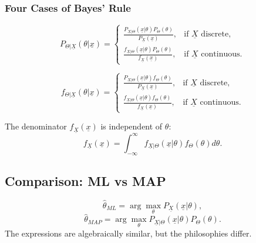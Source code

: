 \subsubsection{Four Cases of Bayes' Rule}
\begin{definition}
    \[
    P_{\Theta|\underline{X}}(\theta|\underline{x}) =
    \begin{cases}
        \frac{P_{\underline{X}|\Theta}(\underline{x}|\theta)P_\Theta(\theta)}{P_{\underline{X}}(\underline{x})}, & \text{if } \underline{X} \text{ discrete}, \\
        \frac{f_{\underline{X}|\Theta}(\underline{x}|\theta)P_\Theta(\theta)}{f_{\underline{X}}(\underline{x})}, & \text{if } \underline{X} \text{ continuous}.
    \end{cases}
    \]

    \[
    f_{\Theta|\underline{X}}(\theta|\underline{x}) =
    \begin{cases}
        \frac{P_{\underline{X}|\Theta}(\underline{x}|\theta)f_\Theta(\theta)}{P_{\underline{X}}(\underline{x})}, & \text{if } \underline{X} \text{ discrete}, \\
        \frac{f_{\underline{X}|\Theta}(\underline{x}|\theta)f_\Theta(\theta)}{f_{\underline{X}}(\underline{x})}, & \text{if } \underline{X} \text{ continuous}.
    \end{cases}
    \]
\end{definition}

\begin{notes}
    The denominator $f_{\underline{X}}(\underline{x})$ is independent of $\theta$:
    \[
    f_{\underline{X}}(\underline{x}) = \int_{-\infty}^{\infty} f_{\underline{X}|\Theta}(\underline{x}|\theta) f_\Theta(\theta) d\theta.
    \]
\end{notes}

\subsection{Comparison: ML vs MAP}
\begin{definition}
    \[
        \hat{\theta}_{ML} = \arg\max_{\theta} P_{\underline{X}}(\underline{x}|\theta),
    \]
    \[
        \hat{\theta}_{MAP} = \arg\max_{\theta} P_{\underline{X}|\Theta}(\underline{x}|\theta) P_\Theta(\theta).
    \]
    The expressions are algebraically similar, but the philosophies differ.
\end{definition}

